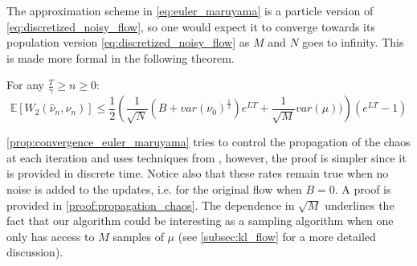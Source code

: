 The approximation scheme in \cref{eq:euler_maruyama} is a particle version of \cref{eq:discretized_noisy_flow}, so one would expect it to converge towards its population version  \cref{eq:discretized_noisy_flow} as $M$ and $N$ goes to infinity. This is made more formal in the following theorem.
\begin{theorem}\label{prop:convergence_euler_maruyama}
	For any $\frac{T}{\gamma}\geq n\geq 0$:
\[
\mathbb{E}[W_{2}(\hat{\nu}_{n},\nu_{n})]\leq \frac{1}{2}\left(\frac{1}{\sqrt{N}}(B+var(\nu_{0})^{\frac{1}{2}})e^{LT}+\frac{1}{\sqrt{M}}var(\mu))\right)(e^{LT}-1)
\]
\end{theorem}
\cref{prop:convergence_euler_maruyama} tries to control the propagation of the chaos at each iteration and uses techniques from \cite{Jourdain:2007}, however, the proof is  simpler since it is provided in discrete time. Notice also that these rates remain true when no noise is added to the updates, i.e. for the original flow when $B=0$. A proof is provided in \cref{proof:propagation_chaos}. The dependence in $\sqrt{M}$ underlines the fact that our algorithm could be interesting as a sampling algorithm when one only has access to $M$ samples of $\mu$ (see \cref{subsec:kl_flow} for a more detailed discussion).

